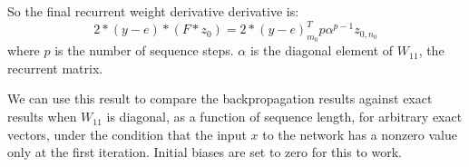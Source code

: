 \documentclass[11pt]{article}
\begin{document}
So the final recurrent weight derivative derivative is: 
$$
2*(y-e) * (F*z_0) = 2*(y-e)^T_{m_0} p \alpha^{p-1} z_{0,n_0}
$$
where $p$ is the number of sequence steps. $\alpha$ is the diagonal element of $W_{11}$, the recurrent matrix. 

We can use this result to compare the backpropagation results against exact results when $W_{11}$ is diagonal, as a function 
of sequence length, for arbitrary exact vectors, under the condition that the input $x$ to the network has a nonzero value
only at the first iteration. Initial biases are set to zero for this to work. 
\end{document}
